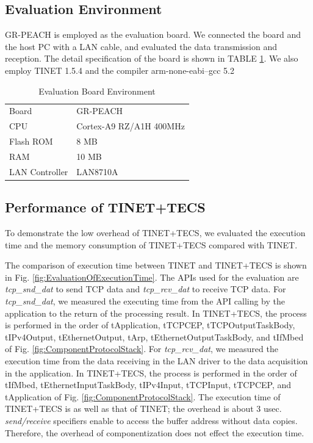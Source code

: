 \documentclass[conference]{IEEEtran/IEEEtran}
\begin{document}
\subsection{Evaluation Environment}

GR-PEACH is employed as the evaluation board.
We connected the board and the host PC with a LAN cable, and evaluated the data transmission and reception.
The detail specification of the board is shown in TABLE \ref{tab:EvaluationBoardEnvironment}.
We also employ TINET 1.5.4 and the compiler arm-none-eabi--gcc 5.2

\begin{table}[t]
    \centering
    \caption{Evaluation Board Environment}
    \begin{tabular}{l|l}
        \hline\hline
        Board           &   GR-PEACH                \\
        CPU             &   Cortex-A9 RZ/A1H 400MHz \\
        Flash ROM       &   8 MB                    \\
        RAM             &   10 MB                   \\
        LAN Controller  &   LAN8710A                \\
        \hline
    \end{tabular}
    \label{tab:EvaluationBoardEnvironment}
\end{table}

\subsection{Performance of TINET+TECS}

To demonstrate the low overhead of TINET+TECS, we evaluated the execution time and the memory consumption of TINET+TECS compared with TINET.

The comparison of execution time between TINET and TINET+TECS is shown in Fig. \ref{fig:EvaluationOfExecutionTime}.
The APIs used for the evaluation are {\it tcp\_snd\_dat} to send TCP data and {\it tcp\_rcv\_dat} to receive TCP data.
For {\it tcp\_snd\_dat}, we measured the executing time from the API calling by the application to the return of the processing result.
In TINET+TECS, the process is performed in the order of tApplication, tTCPCEP, tTCPOutputTaskBody, tIPv4Output, tEthernetOutput, tArp, tEthernetOutputTaskBody, and tIfMbed of Fig. \ref{fig:ComponentProtocolStack}.
For {\it tcp\_rcv\_dat}, we measured the execution time from the data receiving in the LAN driver to the data acquisition in the application.
In TINET+TECS, the process is performed in the order of tIfMbed, tEthernetInputTaskBody, tIPv4Input, tTCPInput, tTCPCEP, and tApplication of Fig. \ref{fig:ComponentProtocolStack}.
The execution time of TINET+TECS is as well as that of TINET; the overhead is about 3 usec.
{\it send/receive} specifiers enable to access the buffer address without data copies.
Therefore, the overhead of componentization does not effect the execution time.
\end{document}
